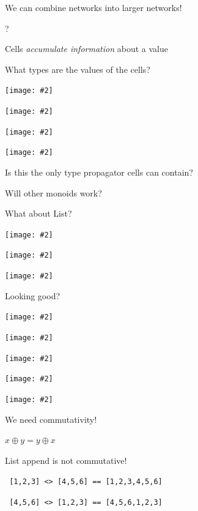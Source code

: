 \documentclass[usenames,dvipsnames,svgnames,table,aspectratio=1610,mathserif]{beamer}
\newcommand{\nl}{\vspace{\baselineskip}}
\newcommand{\pnl}{\pause \nl}
\newcommand{\textslide}[1]{{
\begin{frame}
\begin{center}

#1

\end{center}
\end{frame}
}}
\newcommand{\imageslide}[2][1]{{
\begin{frame}\begin{center}
\texttt{[image: \#2]}
\end{center}\end{frame}
}}
\newcommand{\imageslideleft}[2][1]{{
\begin{frame}
\texttt{[image: \#2]}
\end{frame}
}}
\begin{document}


\textslide{
\Large{We can combine networks into larger networks!}
}

\textslide{\Huge{?}}




\textslide{\Large{Cells {\it accumulate information} about a value}}









%




\textslide{{\LARGE
What types are the values of the cells?
}}


\imageslide{cell1.pdf}
\imageslide{cell2.pdf}
\imageslide{cell3.pdf}
\imageslide{cell4.pdf}








\textslide{
\LARGE{
Is this the only type propagator cells can contain?

Will other monoids work?
}

\pnl

\Large{What about List?}
}

\imageslide[0.6]{doubleplus9.pdf}
\imageslide[0.6]{doubleplus10.pdf}
\imageslide[0.6]{doubleplus11.pdf}
\textslide{\Large{Looking good?}}
\imageslide[0.6]{doubleplus12.pdf}
\imageslide[0.6]{doubleplus13.pdf}
\imageslide[0.6]{doubleplus14.pdf}
\imageslide[0.6]{doubleplus11.pdf}
\imageslide[0.6]{doubleplus14.pdf}


\begin{frame}[fragile]
\begin{center}
\Large{
  We need commutativity!

  \nl

  $x \oplus y = y \oplus x$

  \pnl

  List append is not commutative!

  {\tt {
    [1,2,3] <> [4,5,6] == [1,2,3,4,5,6]
  }}

  {\tt {
    [4,5,6] <> [1,2,3] == [4,5,6,1,2,3]
  }}
}
\end{center}
\end{frame}
\end{document}

